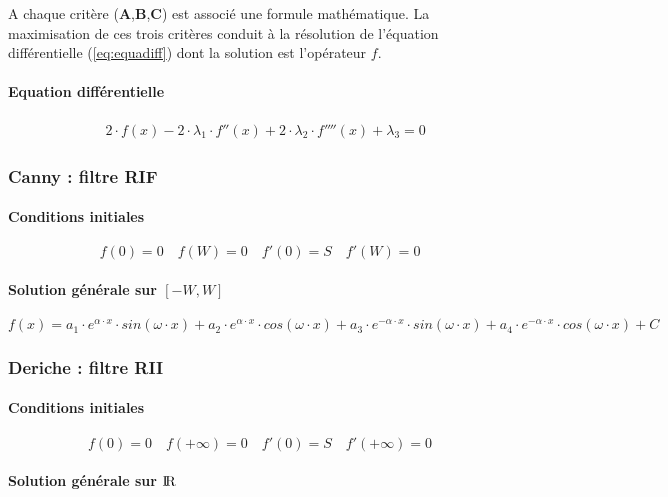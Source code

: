 A chaque critère (\textbf{A},\textbf{B},\textbf{C}) est associé une formule mathématique. La maximisation de ces trois critères conduit à la résolution de l'équation différentielle (\ref{eq:equadiff}) dont la solution est l'opérateur $ f $.

\paragraph{Equation différentielle}

\begin{align}\label{eq:equadiff}
& 2 \cdot f(x) - 2 \cdot \lambda_1 \cdot f''(x) + 2 \cdot \lambda_2 \cdot f''''(x) + \lambda_3 = 0
\end{align}

\subsubsection{Canny : filtre RIF}
\paragraph{Conditions initiales}

\[ f(0)=0 \quad f(W)=0 \quad f'(0)=S \quad f'(W)=0 \]

\paragraph{Solution générale sur $ [-W,W] $}

\[ f(x) = a_1 \cdot e^{\alpha \cdot x} \cdot sin(\omega \cdot x) + a_2 \cdot e^{\alpha \cdot x} \cdot cos(\omega \cdot x) + a_3 \cdot e^{-\alpha \cdot x} \cdot sin(\omega \cdot x) + a_4 \cdot e^{-\alpha \cdot x} \cdot cos(\omega \cdot x) + C \]

\subsubsection{Deriche : filtre RII}
\paragraph{Conditions initiales}

\[ f(0)=0 \quad f(+ \infty)=0 \quad f'(0)=S \quad f'(+ \infty)=0 \]

\paragraph{Solution générale sur $ \rm I\!R $}

